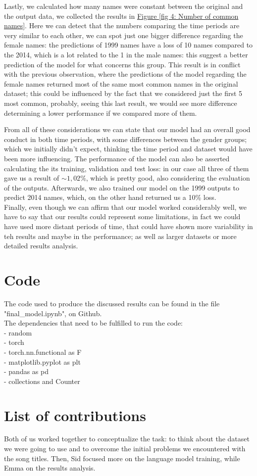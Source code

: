 Lastly, we calculated how many names were constant between the original and the output data, we collected the results in \href{fig 4: Number of common names}{Figure \ref{fig 4: Number of common names}}. Here we can detect that the numbers comparing the time periods are very similar to each other, we can spot just one bigger difference regarding the female names: the predictions of 1999 names have a loss of 10 names compared to the 2014, which is a lot related to the 1 in the male names: this suggest a better prediction of the model for what concerns this group. 
This result is in conflict with the previous observation, where the predictions of the model regarding the female names returned most of the same most common names in the original dataset; this could be influenced by the fact that we considered just the first 5 most common, probably, seeing this last result, we would see more difference determining a lower performance if we compared more of them.

From all of these considerations we can state that our model had an overall good conduct in both time periods, with some differences between the gender groups; which we initially didn't expect, thinking the time period and dataset would have been more influencing. The performance of the model can also be asserted calculating the its training, validation and test loss: in our case all three of them gave us a result of \(\sim 1,02\%\), which is pretty good, also considering the evaluation of the outputs. Afterwards, we also trained our model on the 1999 outputs to predict 2014 names, which, on the other hand returned us a 10\% loss. \\
Finally, even though we can affirm that our model worked considerably well, we have to say that our results could represent some limitations, in fact we could have used more distant periods of time, that could have shown more variability in teh results and maybe in the performance; as well as larger datasets or more detailed results analysis. 

\section*{Code}
The code used to produce the discussed results can be found in the file "final\_model.ipynb", on Github. \\
The dependencies that need to be fulfilled to run the code: \\
- random \\
- torch \\
- torch.nn.functional as F \\
- matplotlib.pyplot as plt \\
- pandas as pd \\
- collections and Counter

\section*{List of contributions}
Both of us worked together to conceptualize the task: to think about the dataset we were going to use and to overcome the initial problems we encountered with the song titles. Then, Sid focused more on the language model training, while Emma on the results analysis.

